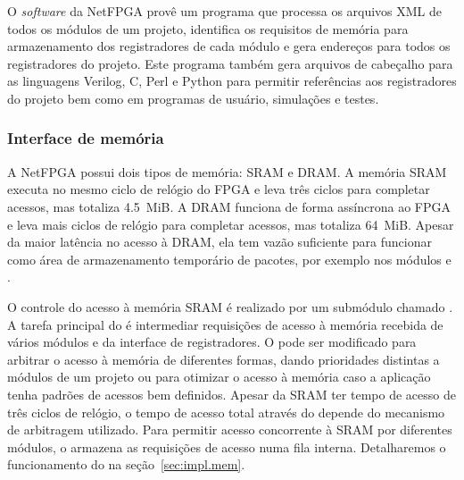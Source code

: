 \newpage{}
O \emph{software} da NetFPGA provê um programa que processa os arquivos
XML de todos os módulos de um projeto, identifica os requisitos de
memória para armazenamento dos registradores de cada módulo e gera
endereços para todos os registradores do projeto.  Este programa também
gera arquivos de cabeçalho para as linguagens Verilog, C, Perl e Python
para permitir referências aos registradores do projeto bem como em
programas de usuário, simulações e testes.

\subsubsection{Interface de memória}

A NetFPGA possui dois tipos de memória: SRAM e DRAM.  A memória SRAM
executa no mesmo ciclo de relógio do FPGA e leva três ciclos para
completar acessos, mas totaliza 4.5~MiB.  A DRAM funciona de forma
assíncrona ao FPGA e leva mais ciclos de relógio para completar acessos,
mas totaliza 64~MiB.  Apesar da maior latência no acesso à DRAM, ela tem
vazão suficiente para funcionar como área de armazenamento temporário de
pacotes, por exemplo nos módulos  e .

O controle do acesso à memória SRAM é realizado por um submódulo chamado
.  A tarefa principal do  é
intermediar requisições de acesso à memória recebida de vários módulos e
da interface de registradores.  O  pode ser
modificado para arbitrar o acesso à memória de diferentes formas, dando
prioridades distintas a módulos de um projeto ou para otimizar o acesso
à memória caso a aplicação tenha padrões de acessos bem definidos.
Apesar da SRAM ter tempo de acesso de três ciclos de relógio, o tempo de
acesso total através do  depende do mecanismo de
arbitragem utilizado.  Para permitir acesso concorrente à SRAM por
diferentes módulos, o  armazena as requisições de
acesso numa fila interna.  Detalharemos o funcionamento do
 na seção~\ref{sec:impl.mem}.

